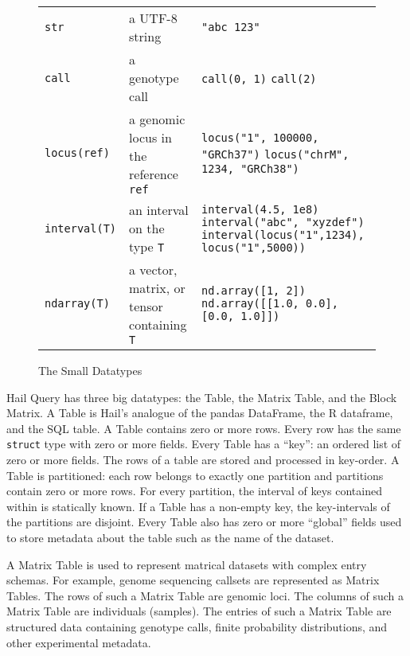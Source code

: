 \documentclass[10pt,a4paper%
]{article}
\begin{document}
\begin{figure}[h]
\begin{adjustbox}{minipage=19cm, center}
\begin{tabularx}{\textwidth}{>{\raggedright\arraybackslash}llX}
      \texttt{str} &%
      a UTF-8 string &%
      \texttt{\footnotesize "abc 123"} \\

      \texttt{call} &%
      a genotype call &%
      \texttt{\footnotesize call(0, 1)} \newline \texttt{\footnotesize call(2)} \\

      \texttt{locus(ref)} &%
      a genomic locus in the reference \texttt{\footnotesize ref} &%
      \texttt{\footnotesize locus("1", 100000, "GRCh37")} \newline \texttt{\footnotesize locus("chrM", 1234, "GRCh38")} \\

      \texttt{interval(T)} &%
      an interval on the type \texttt{T} &%
      \texttt{\footnotesize interval(4.5, 1e8)} \newline \texttt{\footnotesize interval("abc", "xyzdef")} \newline \texttt{\footnotesize interval(locus("1",1234), locus("1",5000))} \\

      \texttt{ndarray(T)} &%
      a vector, matrix, or tensor containing \texttt{\footnotesize T} &%
      \texttt{\footnotesize nd.array([1, 2])} \newline \texttt{\footnotesize nd.array([[1.0, 0.0], [0.0, 1.0]])} \\
    \end{tabularx}
  \end{adjustbox}
  \caption{The Small Datatypes}
  \label{fig:small-datatypes}
\end{figure}

Hail Query has three big datatypes: the Table, the Matrix Table, and the Block Matrix.
A Table is Hail's analogue of the pandas DataFrame, the R dataframe, and the SQL table.
A Table contains zero or more rows.
Every row has the same \texttt{struct} type with zero or more fields.
Every Table has a ``key'': an ordered list of zero or more fields.
The rows of a table are stored and processed in key-order.
A Table is partitioned: each row belongs to exactly one partition and partitions contain zero or more rows.
For every partition, the interval of keys contained within is statically known.
If a Table has a non-empty key, the key-intervals of the partitions are disjoint.
Every Table also has zero or more ``global'' fields used to store metadata about the table such as the name of the dataset.

A Matrix Table is used to represent matrical datasets with complex entry schemas.
For example, genome sequencing callsets are represented as Matrix Tables.
The rows of such a Matrix Table are genomic loci.
The columns of such a Matrix Table are individuals (samples).
The entries of such a Matrix Table are structured data containing genotype calls, finite probability distributions, and other experimental metadata.
\end{document}
